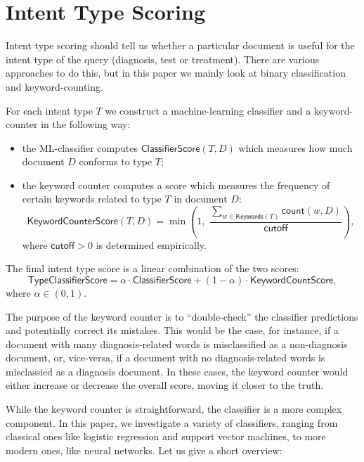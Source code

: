 \section{Intent Type Scoring}\label{intent-scoring}
Intent type scoring should tell us whether a particular document is useful for the intent type of the query 
(diagnosis, test or treatment). There are various approaches to do this, but in this paper we mainly look at
binary classification and keyword-counting.

For each intent type $T$ we construct a machine-learning classifier and a keyword-counter in the following way:
\begin{itemize}
 \item the ML-classifier computes $\textsf{ClassifierScore}(T,D)$ which measures how much document $D$ conforms to type $T$;
 \item the keyword counter computes a score which measures the frequency of certain keywords related to type $T$ in document $D$:
 \begin{equation}\label{basic-formula}
  \textsf{KeywordCounterScore}(T,D) = \min\left(1,\,\, \displaystyle\frac{\displaystyle\sum_{w\in \textsf{Keywords}(T)} \textsf{count}(w,D)}{\textsf{cutoff}}\right),
 \end{equation}
  where $\textsf{cutoff} > 0$ is determined empirically.
\end{itemize}

The final intent type score is a linear combination of the two scores:
\begin{equation}\label{clf-combine-formula}
 \textsf{TypeClassifierScore} = \alpha\cdot\textsf{ClassifierScore} + (1-\alpha)\cdot\textsf{KeywordCountScore},
\end{equation}
where $\alpha\in (0,1)$.

The purpose of the keyword counter is to ``double-check'' the classifier predictions and potentially correct its mistakes.
This would be the case, for instance,
if a document with many diagnosis-related words is misclassified as a non-diagnosis document,
or, vice-versa, if a document with no diagnosis-related words is misclassied as a diagnosis document.
In these cases, the keyword counter would either increase or decrease the overall score, moving it closer to the truth.


While the keyword counter is straightforward, the classifier is a more complex component. In this paper, we investigate 
a variety of classifiers, ranging from classical ones like logistic regression and support vector machines, to more modern
ones, like neural networks. Let us give a short overview:


